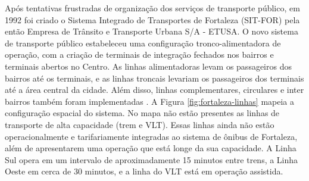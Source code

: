 \documentclass[        
    a4paper,          %
    12pt,             %
    chapter=TITLE,    %
    section=Title,    %
    subsection=Title, %
    oneside,          %
    english,          %
    spanish,          %
    brazil,           %
    fleqn             %
]{abntex2}
\begin{document}
  \begin{figure}[!h]
  \captionsetup{width=16cm}
  \centering
  \end{figure}
  
  Após tentativas frustradas de organização dos serviços de transporte público, em 1992 foi criado o Sistema Integrado de Transportes de Fortaleza (SIT-FOR) pela então Empresa de Trânsito e Transporte Urbana S/A - ETUSA. O novo sistema de transporte público estabeleceu uma configuração tronco-alimentadora de operação, com a criação de terminais de integração fechados nos bairros e terminais abertos no Centro. As linhas alimentadoras levam os passageiros dos bairros até os terminais, e as linhas troncais levariam os passageiros dos terminais até a área central da cidade. Além disso, linhas complementares, circulares e inter bairros também foram implementadas \citep{Fortaleza2015}. A Figura \ref{fig:fortaleza-linhas} mapeia a configuração espacial do sistema. No mapa não estão presentes as linhas de transporte de alta capacidade (trem e VLT). Essas linhas ainda não estão operacionalmente e tarifariamente integradas ao sistema de ônibus de Fortaleza, além de apresentarem uma operação que está longe da sua capacidade. A Linha Sul opera em um intervalo de aproximadamente 15 minutos entre trens, a Linha Oeste em cerca de 30 minutos, e a linha do VLT está em operação assistida.
  
\end{document}

